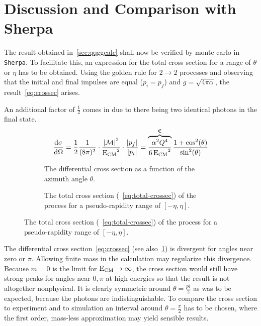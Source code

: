 \section{Discussion and Comparison with Sherpa}%
\label{sec:compsher}

The result obtained in~\ref{sec:qqggcalc} shall now be verified by
monte-carlo in \verb|Sherpa|. To facilitate this, an expression for
the total cross section for a range of \(\theta\) or \(\eta\) has to
be obtained. Using the golden rule for \(2\rightarrow 2\) processes
and observing that the initial and final impulses are equal
(\(p_i=p_f\)) and \(g=\sqrt{4\pi\alpha}\), the
result~\eqref{eq:crossec} arises.

An additional factor of \(\frac{1}{2}\) comes in due to there being
two identical photons in the final state.
\begin{equation}
  \label{eq:crossec}
  \dv{\sigma}{\Omega} =
  \frac{1}{2}\frac{1}{(8\pi)^2}\cdot\frac{\abs{\mathcal{M}}^2}{\operatorname{E_{\text{CM}}}^2}\cdot\frac{\abs{p_f}}{\abs{p_i}}
  = \overbrace{\frac{\alpha^2Q^4}{6\operatorname{E_{\text{CM}}}^2}}^{\mathfrak{C}}\frac{1+\cos^2(\theta)}{\sin^2(\theta)}
\end{equation}


\begin{figure}[ht]
  \centering
  \begin{subfigure}[c]{.45\textwidth}
    \centering {}
    \caption[Plot of the differential cross section of the \(\qqgg\)
    process.]{\label{fig:diffxs} The differential cross section as a
      function of the azimuth angle \(\theta\). }
  \end{subfigure}
  \begin{subfigure}[c]{.45\textwidth}
  \centering
  \caption[Plot of the total cross section of the \(\qqgg\)
  process.]{\label{fig:totxs} The total cross section
    (~\ref{eq:total-crossec}) of the process for a pseudo-rapidity
    range of \([-\eta, \eta]\).}
  \end{subfigure}
\end{figure}

The differential cross section~\eqref{eq:crossec} (see
also~\ref{fig:diffxs}) is divergent for angles near zero or
\(\pi\). Allowing finite mass in the calculation may regularize this
divergence. Because \(m=0\) is the limit for
\(\operatorname{E_{\text{CM}}}\rightarrow\infty\), the cross section would still have strong
peaks for angles near \(0,\pi\) at high energies so that the result is
not altogether nonphysical. It is clearly symmetric around
\(\theta=\frac{pi}{2}\) as was to be expected, because the photons are
indistinguishable. To compare the cross section to experiment and to
simulation an interval around \(\theta=\frac{\pi}{2}\) has to be
chosen, where the first order, mass-less approximation may yield
sensible results.

